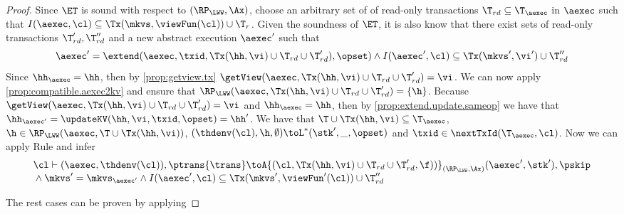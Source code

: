 \begin{proof}
Since \( \ET \) is sound with respect to \( (\RP_{\LWW}, \Ax) \),
choose an arbitrary set of of read-only transactions $\T_{rd} \subseteq \T_{\aexec}$ in \( \aexec \) such that \( I(\aexec, \cl) \subseteq \Tx(\mkvs, \viewFun(\cl)) \cup \T_{r}\).
Given the soundness of \( \ET \), it is also know that there exist sets of read-only transactions  \( \T'_{rd}, \T''_{rd} \) and a new abstract execution \( \aexec' \) such that 
\[
    \aexec' = \extend(\aexec, \txid, \Tx(\hh, \vi) \cup \T_{rd} \cup \T'_{rd} ), \opset)  \land I(\aexec', \cl)  \subseteq  \Tx(\mkvs', \vi') \cup \T''_{rd}
\]
Since $\hh_{\aexec} = \hh$, then by \cref{prop:getview.tx} $\getView(\aexec, \Tx(\hh, \vi) \cup \T_{rd} \cup \T'_{rd}) = \vi$. 
We can now apply \cref{prop:compatible.aexec2kv} and ensure that $\RP_{\LWW}(\aexec, \Tx(\hh, \vi) \cup \T_{rd} \cup \T'_{rd}) = \{\h\}$.
Because $\getView(\aexec, \Tx(\hh, \vi) \cup \T_{rd} \cup \T'_{rd}) = \vi$ and $\hh_{\aexec} = \hh$,
then by \cref{prop:extend.update.sameop} we have that $\hh_{\aexec'} = \updateKV(\hh, \vi, \txid, \opset) = \hh'$. 
We  have that $\T \cup \Tx(\hh, \vi) \subseteq \T_{\aexec}$, $\h \in \RP_{\LWW}(\aexec, \T \cup \Tx(\hh, \vi))$,
$(\thdenv(\cl), \h, \emptyset) \toL^{\ast} (\stk', \_, \opset)$ and $\txid \in \nextTxId(\T_{\aexec}, \cl)$. 
Now we can apply Rule  and infer
\[
\begin{array}{@{}l@{}}
    \cl \vdash (\aexec, \thdenv(\cl)), \ptrans{\trans} 
    \toA{(\cl, \Tx(\hh, \vi) \cup \T_{rd} \cup \T'_{rd}, \f))}_{(\RP_{\LWW}, \Ax)}  
    (\aexec', \stk'), \pskip \\
    {} \land \mkvs' = \mkvs_{\aexec'} 
    \land I(\aexec', \cl) \subseteq \Tx(\mkvs', \viewFun'(\cl)) \cup \T''_{rd} 
\end{array}
\]

The rest cases can be proven by applying \ih

\end{proof}

